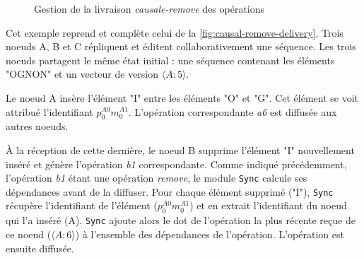 \documentclass[12pt]{thesul}
\newcommand{\trm}[1]{\mathit{#1}}
\newcommand{\id}[3]{$\trm{#1}^{\trm{#2}}_{\trm{#3}}$}
\begin{document}
\begin{figure}[!ht]
{\begin{minipage}{\linewidth}
{
        \label{fig:causal-remove-sync}
      }
      \end{minipage}
    }
  \caption{Gestion de la livraison \emph{causale-remove} des opérations}
  \label{fig:causal-remove-delivery}
\end{figure}

Cet exemple reprend et complète celui de la \autoref{fig:causal-remove-delivery}.
Trois noeuds A, B et C répliquent et éditent collaborativement une séquence.
Les trois noeuds partagent le même état initial : une séquence contenant les éléments "OGNON" et un vecteur de version $\langle A:5 \rangle$.

Le noeud A insère l'élément "I" entre les éléments "O" et "G".
Cet élément se voit attribué l'identifiant \id{p}{A0}{0}\id{m}{A1}{0}.
L'opération correspondante \emph{a6} est diffusée aux autres noeuds.

À la réception de cette dernière, le noeud B supprime l'élément "I" nouvellement inséré et génère l'opération \emph{b1} correspondante.
Comme indiqué précédemment, l'opération \emph{b1} étant une opération \emph{remove}, le module \texttt{Sync} calcule ses dépendances avant de la diffuser.
Pour chaque élément supprimé ("I"), \texttt{Sync} récupère l'identifiant de l'élément (\id{p}{A0}{0}\id{m}{A1}{0}) et en extrait l'identifiant du noeud qui l'a inséré (A).
\texttt{Sync} ajoute alors le dot de l'opération la plus récente reçue de ce noeud ($\langle A:6 \rangle$) à l'ensemble des dépendances de l'opération.
L'opération est ensuite diffusée.
\end{document}
